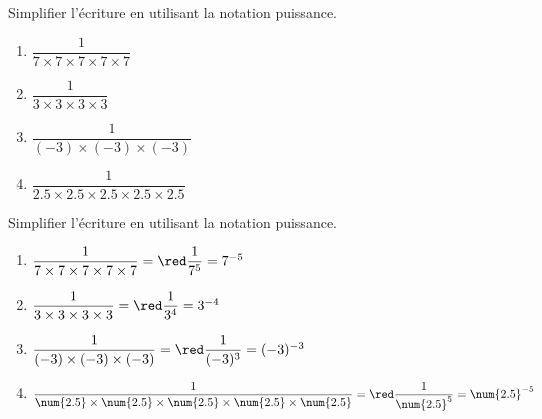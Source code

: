 \begin{exercice*}
    Simplifier l'écriture en utilisant la notation puissance.
    \begin{spacing}{2}
        \begin{multicols}{2}
            \begin{enumerate}
                \item $\dfrac{1}{7\times 7\times 7\times 7\times 7}$
                \item $\dfrac{1}{3\times 3\times 3\times 3}$
                \item $\dfrac{1}{(-3)\times (-3)\times (-3)}$
                \item $\dfrac{1}{\num{2.5}\times \num{2.5}\times \num{2.5}\times \num{2.5}\times \num{2.5}}$
            \end{enumerate}
        \end{multicols}
    \end{spacing}
\end{exercice*}
\begin{corrige}
    Simplifier l'écriture en utilisant la notation puissance.
    \begin{spacing}{2}
        \begin{enumerate}
            \item $\dfrac{1}{7\times 7\times 7\times 7\times 7}                                         ={\red \dfrac{1}{7^5}          = 7^{-5}}$
            \item $\dfrac{1}{3\times 3\times 3\times 3}                                                 ={\red \dfrac{1}{3^4}          = 3^{-4}}$
            \item $\dfrac{1}{(-3)\times (-3)\times (-3)}                                                ={\red \dfrac{1}{(-3)^3}       = (-3)^{-3}}$
            \item $\dfrac{1}{\num{2.5}\times \num{2.5}\times \num{2.5}\times \num{2.5}\times \num{2.5}} ={\red \dfrac{1}{\num{2.5}^5}  = \num{2.5}^{-5}}$
        \end{enumerate}
    \end{spacing}
    \vspace*{-10mm}
\end{corrige}

